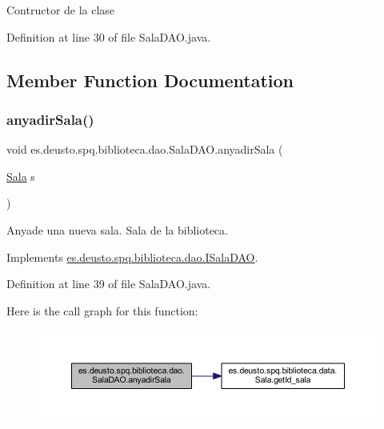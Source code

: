 Contructor de la clase 

Definition at line 30 of file Sala\+D\+A\+O.\+java.



\subsection{Member Function Documentation}
\mbox{\label{classes_1_1deusto_1_1spq_1_1biblioteca_1_1dao_1_1_sala_d_a_o_ab057300f33df6ae974e6e949900b1dc7}} 
\subsubsection{\texorpdfstring{anyadir\+Sala()}{anyadirSala()}}
{\footnotesize\ttfamily void es.\+deusto.\+spq.\+biblioteca.\+dao.\+Sala\+D\+A\+O.\+anyadir\+Sala (\begin{DoxyParamCaption}\item[{\mbox{\hyperlink{classes_1_1deusto_1_1spq_1_1biblioteca_1_1data_1_1_sala}{Sala}}}]{s }\end{DoxyParamCaption})}

Anyade una nueva sala.  Sala de la biblioteca. 

Implements \mbox{\hyperlink{interfacees_1_1deusto_1_1spq_1_1biblioteca_1_1dao_1_1_i_sala_d_a_o_a20257b6e5501dd812441aa6795fcd24a}{es.\+deusto.\+spq.\+biblioteca.\+dao.\+I\+Sala\+D\+AO}}.



Definition at line 39 of file Sala\+D\+A\+O.\+java.

Here is the call graph for this function\+:
\nopagebreak
\begin{figure}[H]
\begin{center}
\leavevmode
\includegraphics[width=350pt]{classes_1_1deusto_1_1spq_1_1biblioteca_1_1dao_1_1_sala_d_a_o_ab057300f33df6ae974e6e949900b1dc7_cgraph}
\end{center}
\end{figure}
\mbox{\label{classes_1_1deusto_1_1spq_1_1biblioteca_1_1dao_1_1_sala_d_a_o_a3095e0681af1d32bd5706ca6941e0784}} 
